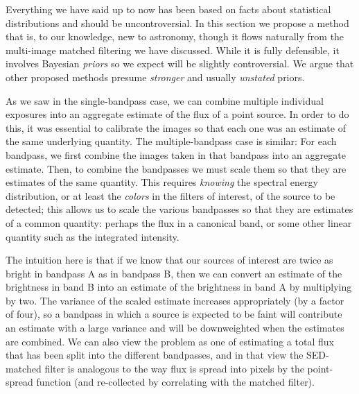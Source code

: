 \documentclass[11pt,letterpaper,linenumbers]{aastex63}
\begin{document}
Everything we have said up to now has been based on facts about
statistical distributions and should be uncontroversial.  In this
section we propose a method that is, to our knowledge, new to
astronomy, though it flows naturally from the multi-image matched
filtering we have discussed. While it is fully defensible, it involves
Bayesian \emph{priors} so we expect will be slightly controversial.  We argue
that other proposed methods presume \emph{stronger} and usually
\emph{unstated} priors.

As we saw in the single-bandpass case, we can combine multiple
individual exposures into an aggregate estimate of the flux of a point
source.  In order to do this, it was essential to calibrate the images
so that each one was an estimate of the same underlying quantity.  The
multiple-bandpass case is similar: For each bandpass, we first combine
the images taken in that bandpass into an aggregate estimate.  Then,
to combine the bandpasses we must scale them so that they are
estimates of the same quantity.  This requires \emph{knowing} the
spectral energy distribution, or at least the \emph{colors} in the
filters of interest, of the source to be detected; this allows us to
scale the various bandpasses so that they are estimates of a common
quantity: perhaps the flux in a canonical band, or some other linear
quantity such as the integrated intensity.




The intuition here is that if we know that our sources of interest are
twice as bright in bandpass A as in bandpass B, then we can convert an
estimate of the brightness in band B into an estimate of the
brightness in band A by multiplying by two.  The variance of the
scaled estimate increases appropriately (by a factor of four), so a
bandpass in which a source is expected to be faint will contribute an
estimate with a large variance and will be downweighted when the
estimates are combined.  We can also view the problem as one of
estimating a total flux that has been split into the different
bandpasses, and in that view the SED-matched filter is analogous to
the way flux is spread into pixels by the point-spread function (and
re-collected by correlating with the matched filter).

\newcommand{\sigdj}{\sigma_{D_j}}
\end{document}
